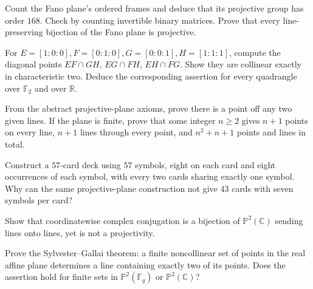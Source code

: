 \begin{exercise}[$\star\star$]\label{geometry:ex:fano168}
Count the Fano plane's ordered frames and deduce that its projective group has order $168$. Check by counting invertible binary matrices. Prove that every line-preserving bijection of the Fano plane is projective.
\end{exercise}
\begin{exercise}[$\star$]\label{geometry:ex:fanodiag}
For $E=[1:0:0],F=[0:1:0],G=[0:0:1],H=[1:1:1]$, compute the diagonal points $EF\cap GH$, $EG\cap FH$, $EH\cap FG$. Show they are collinear exactly in characteristic two. Deduce the corresponding assertion for every quadrangle over $\mathbb F_2$ and over $\mathbb R$.
\end{exercise}
\begin{exercise}[$\star\star$]\label{geometry:ex:planeorder}
From the abstract projective-plane axioms, prove there is a point off any two given lines. If the plane is finite, prove that some integer $n\ge2$ gives $n+1$ points on every line, $n+1$ lines through every point, and $n^2+n+1$ points and lines in total.
\end{exercise}
\begin{exercise}[$\star\star$]\label{geometry:ex:dobble}
Construct a $57$-card deck using $57$ symbols, eight on each card and eight occurrences of each symbol, with every two cards sharing exactly one symbol. Why can the same projective-plane construction not give $43$ cards with seven symbols per card?
\end{exercise}
\begin{exercise}[$\star\star$]\label{geometry:ex:complexcollineation}
Show that coordinatewise complex conjugation is a bijection of $\mathbb P^2(\mathbb C)$ sending lines onto lines, yet is not a projectivity.
\end{exercise}
\begin{exercise}[$\star\star\star$]\label{geometry:ex:sylvestergallai}
Prove the Sylvester--Gallai theorem: a finite noncollinear set of points in the real affine plane determines a line containing exactly two of its points. Does the assertion hold for finite sets in $\mathbb P^2(\mathbb F_q)$ or $\mathbb P^2(\mathbb C)$?
\end{exercise}

